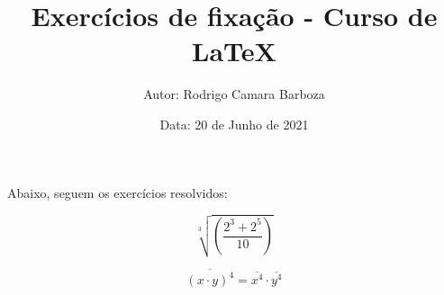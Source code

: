 \documentclass[a4paper, 12pt]{article}
\title{\textbf{Exercícios de fixação - Curso de LaTeX}}
\author{Autor: Rodrigo Camara Barboza}
\date{Data: 20 de Junho de 2021}
\begin{document}
\maketitle

Abaixo, seguem os exercícios resolvidos:

\begin{equation}
\sqrt[3]{\left( \frac{2^{3} + 2^{5}}{10}\right)}
\end{equation}

\begin{equation}
\overline{(x \cdot y)^{4}} = \overline{x^{4}} \cdot \overline{y^{4}}
\end{equation}
\end{document}
